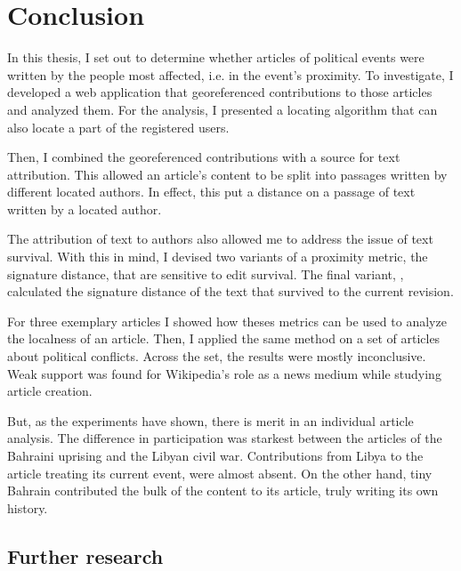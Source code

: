 \chapter{Conclusion}\label{ch:conclusion}

In this thesis, I set out to determine whether articles of political events were written by the people most affected, i.e. in the event's proximity.
To investigate, I developed a web application that georeferenced contributions to those articles and analyzed them.
For the analysis, I presented a locating algorithm that can also locate a part of the registered users.

Then, I combined the georeferenced contributions with a source for text attribution. 
This allowed an article's content to be split into passages written by different located authors. 
In effect, this put a distance on a passage of text written by a located author.

The attribution of text to authors also allowed me to address the issue of text survival.
With this in mind, I devised two variants of a proximity metric, the signature distance, that are sensitive to edit survival.
The final variant, , calculated the signature distance of the text that survived to the current revision.

For three exemplary articles I showed how theses metrics can be used to analyze the localness of an article.
Then, I applied the same method on a set of articles about political conflicts.
Across the set, the results were mostly inconclusive.
Weak support was found for Wikipedia's role as a news medium while studying article creation.

But, as the experiments have shown, there is merit in an individual article analysis.
The difference in participation was starkest between the articles of the Bahraini uprising and the Libyan civil war.
Contributions from Libya to the article treating its current event, were almost absent.
On the other hand, tiny Bahrain contributed the bulk of the content to its article, truly writing its own history.


\section{Further research}

